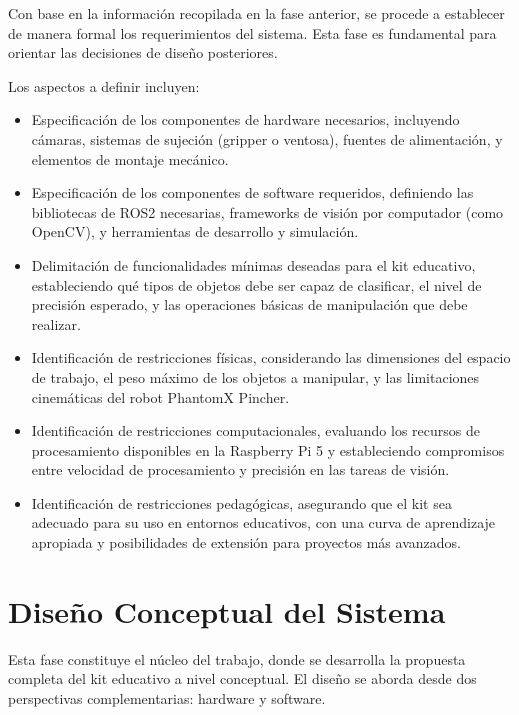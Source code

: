 Con base en la información recopilada en la fase anterior, se procede a establecer de manera formal los requerimientos del sistema. Esta fase es fundamental para orientar las decisiones de diseño posteriores.

Los aspectos a definir incluyen:

\begin{itemize}
    \item Especificación de los componentes de hardware necesarios, incluyendo cámaras, sistemas de sujeción (gripper o ventosa), fuentes de alimentación, y elementos de montaje mecánico.
    
    \item Especificación de los componentes de software requeridos, definiendo las bibliotecas de ROS2 necesarias, frameworks de visión por computador (como OpenCV), y herramientas de desarrollo y simulación.
    
    \item Delimitación de funcionalidades mínimas deseadas para el kit educativo, estableciendo qué tipos de objetos debe ser capaz de clasificar, el nivel de precisión esperado, y las operaciones básicas de manipulación que debe realizar.
    
    \item Identificación de restricciones físicas, considerando las dimensiones del espacio de trabajo, el peso máximo de los objetos a manipular, y las limitaciones cinemáticas del robot PhantomX Pincher.
    
    \item Identificación de restricciones computacionales, evaluando los recursos de procesamiento disponibles en la Raspberry Pi 5 y estableciendo compromisos entre velocidad de procesamiento y precisión en las tareas de visión.
    
    \item Identificación de restricciones pedagógicas, asegurando que el kit sea adecuado para su uso en entornos educativos, con una curva de aprendizaje apropiada y posibilidades de extensión para proyectos más avanzados.
\end{itemize}

\section{Diseño Conceptual del Sistema}

Esta fase constituye el núcleo del trabajo, donde se desarrolla la propuesta completa del kit educativo a nivel conceptual. El diseño se aborda desde dos perspectivas complementarias: hardware y software.

